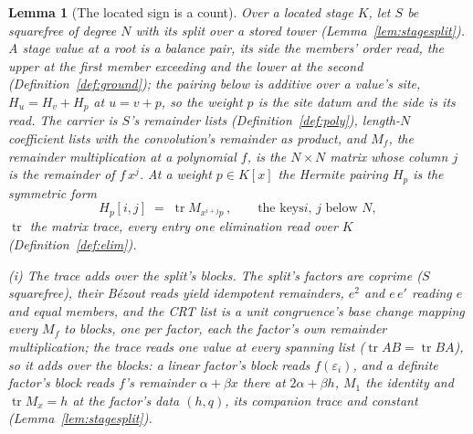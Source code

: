 \documentclass[11pt]{article}
\newtheorem{lemma}{Lemma}
\theoremstyle{definition}
\begin{document}
\begin{lemma}[The located sign is a count]\label{lem:hermitesign}
Over a located stage $K$, let $S$ be squarefree of degree $N$ with
its split over a stored tower
(Lemma~\ref{lem:stagesplit}). A stage value at a root is
a balance pair, its \emph{side} the members' order read, the
\emph{upper} at the first member exceeding and the \emph{lower} at
the second (Definition~\ref{def:ground}); the pairing below is
additive over a value's site, $H_u=H_v+H_p$ at $u=v+p$, so the
weight $p$ is the site datum and the side is its read. The carrier is $S$'s \emph{remainder
lists} (Definition~\ref{def:poly}), length-$N$ coefficient lists
with the convolution's remainder as product, and $M_f$,
the \emph{remainder multiplication} at a polynomial $f$, is the
$N\times N$ matrix whose column $j$ is the remainder of $f\,x^j$.
At a weight $p\in K[x]$ the
\emph{Hermite pairing} $H_p$ is the symmetric form
\[
H_p[i,j]\;=\;\operatorname{tr}M_{x^{i+j}p}\,,\qquad\text{the keys
$i$, $j$ below $N$},
\]
$\operatorname{tr}$ the
matrix trace, every entry one elimination read over $K$
(Definition~\ref{def:elim}).

\emph{(i) The trace adds over the split's blocks.} The split's
factors are coprime ($S$ squarefree), their B\'ezout reads yield
idempotent remainders, $e^2$ and $e\,e'$ reading $e$ and equal members, and
the CRT list is a unit congruence's base change mapping every $M_f$ to
blocks, one per factor, each the factor's own remainder
multiplication; the trace reads one value at every spanning list
($\operatorname{tr}AB=\operatorname{tr}BA$), so it adds over the
blocks: a linear factor's block reads
$f(\varepsilon_i)$, and a definite factor's block reads $f$'s
remainder $\alpha+\beta x$ there at $2\alpha+\beta h$, $M_1$ the
identity and $\operatorname{tr}M_x=h$ at the factor's data $(h,q)$,
its companion trace and constant (Lemma~\ref{lem:stagesplit}).


\end{lemma}
\end{document}
